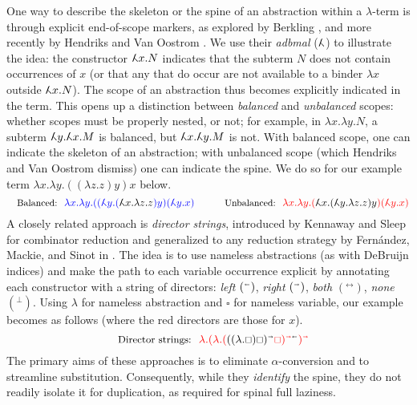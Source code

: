 \documentclass[a4paper,UKenglish,cleveref, autoref]{lipics-v2019}
\newcommand\adbmal{\reflectbox{$\lambda$}}
\newcommand\red{\color{red}}
\newcommand\blue{\color{blue}}
\newcommand\black{\color{black}}
\newcommand\dirL{{\scriptscriptstyle\shortleftarrow}}
\newcommand\dirR{{\scriptscriptstyle\shortrightarrow}}
\newcommand\dirRL{{\scriptscriptstyle\leftrightarrow}}
\newcommand\dirSTOP{{\scriptscriptstyle\bot}}
\newcommand\var{{\scriptstyle\square}}
\begin{document}
One way to describe the skeleton or the spine of an abstraction within a $\lambda$-term is through explicit end-of-scope markers, as explored by Berkling \cite{berkling1976symmetric,BERKLING198289}, and more recently by Hendriks and Van Oostrom \cite{hendriks2003lambda}. We use their \emph{adbmal} ($\adbmal$) to illustrate the idea: the constructor $\adbmal x.N$ indicates that the subterm $N$ does not contain occurrences of $x$ (or that any that do occur are not available to a binder $\lambda x$ outside $\adbmal x.N$). The scope of an abstraction thus becomes explicitly indicated in the term. This opens up a distinction between \emph{balanced} and \emph{unbalanced} scopes: whether scopes must be properly nested, or not; for example, in $\lambda x.\lambda y.N$, a subterm $\adbmal y.\adbmal x.M$ is balanced, but $\adbmal x.\adbmal y.M$ is not. With balanced scope, one can indicate the skeleton of an abstraction; with unbalanced scope (which Hendriks and Van Oostrom dismiss) one can indicate the spine. We do so for our example term $\lambda x.\lambda y.((\lambda z.z)y)x$ below. 
%
\[
\text{\small Balanced:}
~~{\blue\lambda x. \lambda y. ((\adbmal y.({\black\adbmal x.\lambda z.z})y)(\adbmal y.x)}
\qquad
\text{\small Unbalanced:}
~~{\red\lambda x. \lambda y. ({\black\adbmal x. (\adbmal y.\lambda z.z)y})(\adbmal y.x)}
\]
%
A closely related approach is \emph{director strings}, introduced by Kennaway and Sleep \cite{kennaway1988director} for combinator reduction and generalized to any reduction strategy by Fern\'{a}ndez, Mackie, and Sinot in \cite{fernandez2005lambda}. The idea is to use nameless abstractions (as with  DeBruijn indices) and make the path to each variable occurrence explicit by  annotating each constructor with a string of directors: \emph{left} $(^\dirL)$, \emph{right} $(^\dirR)$, \emph{both} $(^\dirRL)$, \emph{none} $(^\dirSTOP)$. Using $\lambda$ for nameless abstraction and $\var$ for nameless variable, our example becomes as follows (where the red directors are those for $x$).
\[
\text{\small Director strings:}~~\red\lambda.(\lambda.({\black((\lambda.\var)\var)^\dirR}\var)^{\dirR\black\dirL})^\dirR
\]
The primary aims of these approaches is to eliminate $\alpha$-conversion and to streamline substitution. Consequently, while they \emph{identify} the spine, they do not readily isolate it for duplication, as required for spinal full laziness.
\end{document}
